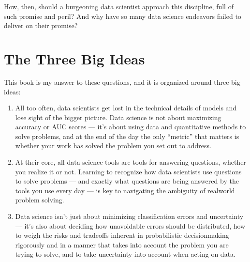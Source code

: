 \documentclass[letterpaper,10pt,english]{jupyterBook}
\begin{document}
\sphinxAtStartPar
How, then, should a burgeoning data scientist approach this discipline, full of such promise and peril? And why have so many data science endeavors failed to deliver on their promise?


\section{The Three Big Ideas}
\label{\detokenize{10_introduction/10_solving_problems_with_data:the-three-big-ideas}}
\sphinxAtStartPar
This book is my answer to these questions, and it is organized around three big ideas:
\begin{enumerate}
%
\item {} 
\sphinxAtStartPar
{} All too often, data scientists get lost in the technical details of models and lose sight of the bigger picture. Data science is not about maximizing accuracy or AUC scores — it’s about using data and quantitative methods to solve problems, and at the end of the day the only “metric” that matters is whether your work has solved the problem you set out to address.

\item {} 
\sphinxAtStartPar
{} At their core, all data science tools are tools for answering questions, whether you realize it or not. Learning to recognize how data scientists use questions to solve problems — and exactly what questions are being answered by the tools you use every day — is key to navigating the ambiguity of real\sphinxhyphen{}world problem solving.

\item {} 
\sphinxAtStartPar
{} Data science isn’t just about minimizing classification errors and uncertainty — it’s also about deciding how unavoidable errors should be distributed, how to weigh the risks and trade\sphinxhyphen{}offs inherent in probabilistic decision\sphinxhyphen{}making rigorously and in a manner that takes into account the problem you are trying to solve, and to take uncertainty into account when acting on data.

\end{enumerate}
\end{document}
